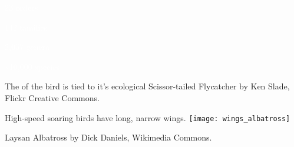 
{
\begin{frame}[t,plain]
	\vspace{7em}
	
	\pause
	\hangpara\Large\hspace{14em}\textcolor{white}{23 orders}

	\hangpara\Large\hspace{14em}\textcolor{white}{142 families}
	
	\hangpara\Large\hspace{14em}\textcolor{white}{2,057 genera}
	
	\hangpara\Large\hspace{14em}\textcolor{white}{\textasciitilde10,000 species}

	

\end{frame}
}


{
\begin{frame}[b,plain]{The  of the bird is tied to it’s ecological }
	\hfill\tiny Scissor-tailed Flycatcher by Ken Slade, Flickr Creative Commons.
\end{frame}
}



{
\begin{frame}[c,plain]{High-speed soaring birds have long, narrow wings.}
	\centering
	\texttt{[image: wings\_albatross]}\par
\end{frame}
}

{
\begin{frame}[b,plain]
	\tiny Laysan Albatross by Dick Daniels, Wikimedia Commons.
\end{frame}
}

